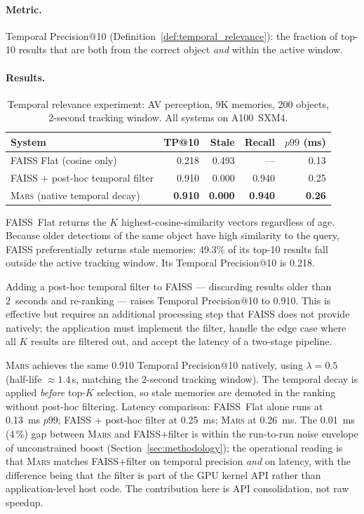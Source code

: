 \documentclass[11pt]{article}
\newcommand{\mars}{\textsc{Mars}}
\begin{document}
\paragraph{Metric.} Temporal Precision@10
(Definition~\ref{def:temporal_relevance}): the fraction of top-10
results that are both from the correct object \emph{and} within the
active window.

\paragraph{Results.}

\begin{table}[ht]
\centering
\small
\caption{Temporal relevance experiment: AV perception, 9K memories, 200
objects, 2-second tracking window. All systems on A100~SXM4.}
\label{tab:temporal}
\begin{tabular}{lrrrr}
\toprule
\textbf{System} & \textbf{TP@10} & \textbf{Stale} & \textbf{Recall} & \textbf{$p99$ (ms)} \\
\midrule
FAISS Flat (cosine only)              & 0.218 & 0.493 & ---   & 0.13 \\
FAISS + post-hoc temporal filter      & 0.910 & 0.000 & 0.940 & 0.25 \\
\mars{} (native temporal decay)       & \textbf{0.910} & \textbf{0.000} & \textbf{0.940} & \textbf{0.26} \\
\bottomrule
\end{tabular}
\end{table}

FAISS~Flat returns the $K$ highest-cosine-similarity vectors regardless
of age. Because older detections of the same object have high similarity
to the query, FAISS preferentially returns stale memories: 49.3\% of its
top-10 results fall outside the active tracking window. Its Temporal
Precision@10 is 0.218.

Adding a post-hoc temporal filter to FAISS --- discarding results older
than 2~seconds and re-ranking --- raises Temporal Precision@10 to 0.910.
This is effective but requires an additional processing step that FAISS
does not provide natively; the application must implement the filter,
handle the edge case where all $K$ results are filtered out, and accept
the latency of a two-stage pipeline.

\mars{} achieves the same 0.910 Temporal Precision@10 natively, using
$\lambda = 0.5$ (half-life $\approx 1.4$\,s, matching the 2-second
tracking window). The temporal decay is applied \emph{before} top-$K$
selection, so stale memories are demoted in the ranking without
post-hoc filtering. Latency comparison: FAISS~Flat alone runs at
0.13~ms $p99$; FAISS + post-hoc filter at 0.25~ms; \mars{} at
0.26~ms. The 0.01~ms (4\,\%) gap between \mars{} and FAISS+filter is
within the run-to-run noise envelope of unconstrained boost
(Section~\ref{sec:methodology}); the operational reading is that
\mars{} matches FAISS+filter on temporal precision \emph{and} on
latency, with the difference being that the filter is part of the
GPU kernel API rather than application-level host code. The
contribution here is API consolidation, not raw speedup.
\end{document}
